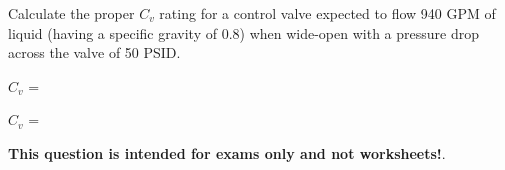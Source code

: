 

Calculate the proper $C_v$ rating for a control valve expected to flow 940 GPM of liquid (having a specific gravity of 0.8) when wide-open with a pressure drop across the valve of 50 PSID.

\vskip 10pt

$C_v$ = \underbar{\hskip 50pt}







$C_v$ = 







{\bf This question is intended for exams only and not worksheets!}.



